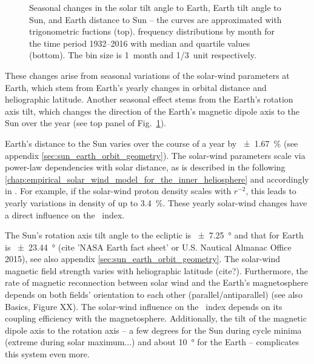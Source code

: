 \begin{figure}[htb]
\begin{floatrow}
{		}{
			\caption{Seasonal changes in the solar tilt angle to Earth, Earth tilt angle to Sun, and Earth distance to Sun -- the curves are approximated with trigonometric fuctions (top). \Kp{} frequency distributions by month for the time period 1932--2016 with median and quartile values (bottom). The bin size is 1~month and \SI{1/3}{\Kp}~unit respectively.}
			\label{fig:Kp_seasonal_c}
		}
	\end{floatrow}
\end{figure}
These \Kp{} changes arise from seasonal variations of the solar-wind parameters at Earth, which stem from Earth's yearly changes in orbital distance and heliographic latitude. Another seasonal effect stems from the Earth's rotation axis tilt, which changes the direction of the Earth's magnetic dipole axis to the Sun over the year (see top panel of Fig.~\ref{fig:Kp_seasonal_c}).

Earth's distance to the Sun varies over the course of a year by \SI{+-1.67}{\percent} (see appendix \autoref{sec:sun_earth_orbit_geometry}). The solar-wind parameters scale via power-law dependencies with solar distance, as is described in the following \autoref{chap:empirical_solar_wind_model_for_the_inner_heliosphere} and accordingly in \citet{Venzmer2017}. For example, if the solar-wind proton density scales with $r^{-2}$, this leads to yearly variations in density of up to \SI{3.4}{\percent}. These yearly solar-wind changes have a direct influence on the \Kp{}~index.

The Sun's rotation axis tilt angle to the ecliptic is \SI{+-7.25}{\degree} and that for Earth is \SI{+-23.44}{\degree} (cite 'NASA Earth fact sheet' or U.S. Nautical Almanac Office 2015), see also appendix \autoref{sec:sun_earth_orbit_geometry}. The solar-wind magnetic field strength varies with heliographic latitude (cite?). Furthermore, the rate of magnetic reconnection between solar wind and the Earth's magnetosphere depends on both fields' orientation to each other (parallel/antiparallel) (see also Basics, Figure XX). The solar-wind influence on the \Kp{}~index depends on its coupling efficiency with the magnetosphere. Additionally, the tilt of the magnetic dipole axis to the rotation axis -- a few degrees for the Sun during cycle minima (extreme during solar maximum...) and about \SI{10}{\degree} for the Earth -- complicates this system even more.

